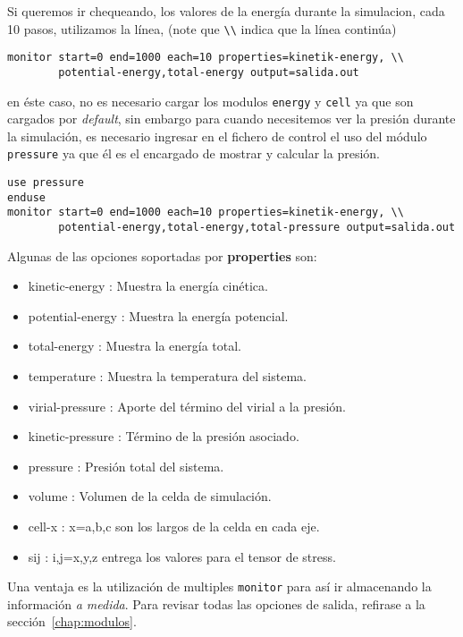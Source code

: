 Si queremos ir chequeando, los valores de la energ\'ia durante la simulacion, cada 10 pasos, utilizamos la l\'inea, (note que \verb|\\| indica que la l\'inea contin\'ua)

\begin{verbatim}
monitor start=0 end=1000 each=10 properties=kinetik-energy, \\
        potential-energy,total-energy output=salida.out
\end{verbatim}

en \'este caso, no es necesario cargar los modulos \verb|energy| y \verb|cell| ya que son cargados por \textit{default}, sin embargo para cuando necesitemos ver la presi\'on durante la simulaci\'on, es necesario ingresar en el fichero de control el uso del m\'odulo \verb|pressure| ya que \'el es el encargado de mostrar y calcular la presi\'on.

\begin{verbatim}
use pressure
enduse
monitor start=0 end=1000 each=10 properties=kinetik-energy, \\
        potential-energy,total-energy,total-pressure output=salida.out
\end{verbatim}

Algunas de las opciones soportadas por \textbf{properties} son:

\begin{itemize}
 \item kinetic-energy : Muestra la energ\'ia cin\'etica.
 \item potential-energy : Muestra la energ\'ia potencial.
 \item total-energy : Muestra la energ\'ia total.
 \item temperature : Muestra la temperatura del sistema.
 \item virial-pressure : Aporte del t\'ermino del virial a la presi\'on.
 \item kinetic-pressure : T\'ermino de la presi\'on asociado.
 \item pressure : Presi\'on total del sistema.
 \item volume : Volumen de la celda de simulaci\'on.
 \item cell-x : x=a,b,c son los largos de la celda en cada eje.
 \item sij : i,j=x,y,z entrega los valores para el tensor de stress.
\end{itemize}

Una ventaja es la utilizaci\'on de multiples \verb|monitor| para as\'i ir almacenando la informaci\'on \textit{a medida}. Para revisar todas las opciones de salida, refirase a la secci\'on~\ref{chap:modulos}.

